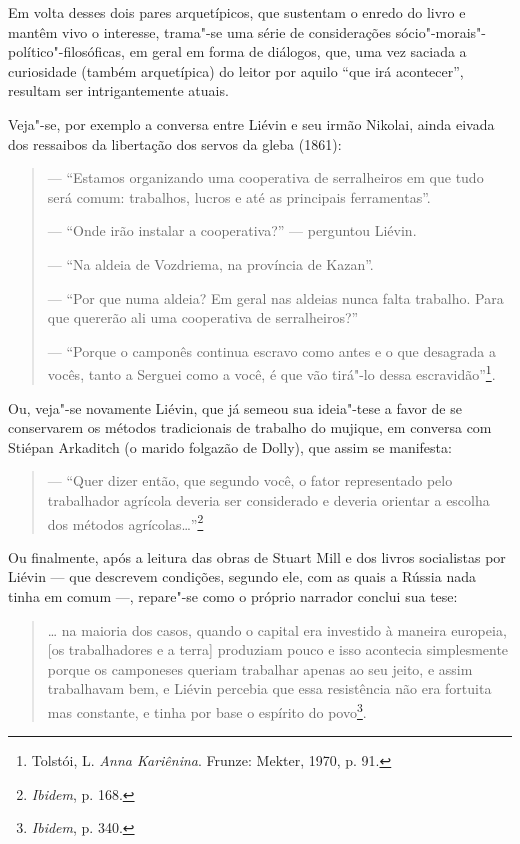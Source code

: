 {{Em volta desses dois pares arquetípicos, que sustentam o enredo do
livro e mantêm vivo o interesse, trama"-se uma série de considerações
sócio"-morais"-político"-filosóficas, em geral em forma de diálogos, que,
uma vez saciada a curiosidade (também arquetípica) do leitor por aquilo
``que irá acontecer'', resultam ser intrigantemente atuais.

Veja"-se, por exemplo a conversa entre Liévin e seu irmão Nikolai, ainda
eivada dos ressaibos da libertação dos servos da gleba (1861):

\begin{quote}
--- ``Estamos organizando uma cooperativa de serralheiros em que tudo será
comum: trabalhos, lucros e até as principais ferramentas''.

\noindent --- ``Onde irão instalar a cooperativa?'' --- perguntou Liévin.

\noindent --- ``Na aldeia de Vozdriema, na província de Kazan''.

\noindent --- ``Por que numa aldeia? Em geral nas aldeias nunca falta trabalho. Para
que quererão ali uma cooperativa de serralheiros?''

\noindent --- ``Porque o camponês continua escravo como antes e o que desagrada a
vocês, tanto a Serguei como a você, é que vão tirá"-lo dessa escravidão''\footnote{Tolstói, L. \emph{Anna Kariênina}. Frunze: Mekter, 1970, p. 91.}.
\end{quote}

Ou, veja"-se novamente Liévin, que já semeou sua ideia"-tese a
favor de se conservarem os métodos tradicionais de trabalho do
mujique, em conversa com Stiépan Arkaditch (o marido folgazão de
Dolly), que assim se manifesta:

\begin{quote}
--- ``Quer dizer então, que segundo você, o fator representado pelo
trabalhador agrícola deveria ser considerado e deveria orientar a
escolha dos métodos agrícolas\ldots{}''\footnote{\emph{Ibidem}, p. 168.}
\end{quote}

Ou finalmente, após a leitura das obras de Stuart Mill e dos livros
socialistas por Liévin --- que descrevem condições, segundo ele, com as
quais a Rússia nada tinha em comum ---, repare"-se como o próprio
narrador conclui sua tese:

\begin{quote}
\ldots{} na maioria dos casos, quando o capital era investido à maneira
europeia, [os trabalhadores e a terra] produziam pouco e isso
acontecia simplesmente porque os camponeses queriam trabalhar apenas ao
seu jeito, e assim trabalhavam bem, e Liévin percebia que essa
resistência não era fortuita mas constante, e tinha por base o espírito
do povo\footnote{\emph{Ibidem}, p. 340.}.
\end{quote}

}}
